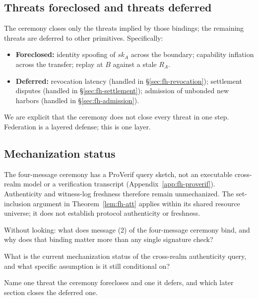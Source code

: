 \documentclass[11pt,a4paper]{article}
\theoremstyle{definition}
\theoremstyle{remark}
\begin{document}
\pdexercisepointerone{\ref{ex:fh-xfer-attenuation}}{\pageref{ex:fh-xfer-attenuation}}

\subsection{Threats foreclosed and threats deferred}\label{sec:fh-xfer-threats}

The ceremony closes only the threats implied by those bindings; the remaining
threats are deferred to other primitives. Specifically:

\begin{itemize}[nosep]
\item \textbf{Foreclosed:} identity spoofing of $\mathit{sk}_A$ across the boundary; capability inflation across the transfer; replay at $B$ against a stale $R_A$.
\item \textbf{Deferred:} revocation latency (handled in \S\ref{sec:fh-revocation}); settlement disputes (handled in \S\ref{sec:fh-settlement}); admission of unbonded new harbors (handled in \S\ref{sec:fh-admission}).
\end{itemize}

%
We are explicit that the ceremony does not close every threat in one step. Federation is a layered defense; this is one layer.

\subsection{Mechanization status}\label{sec:fh-xfer-mech}

The four-message ceremony has a ProVerif query sketch, not an executable cross-realm model or a verification transcript (Appendix~\ref{app:fh-proverif}). Authenticity and witness-log freshness therefore remain unmechanized. The set-inclusion argument in Theorem~\ref{lem:fh-att} applies within its shared resource universe; it does not establish protocol authenticity or freshness.

\begin{pdrecitationbody}
\item Without looking: what does message (2) of the four-message ceremony bind, and why does that binding matter more than any single signature check?
\item What is the current mechanization status of the cross-realm authenticity query, and what specific assumption is it still conditional on?
\item Name one threat the ceremony forecloses and one it defers, and which later section closes the deferred one.
\end{pdrecitationbody}
\end{document}

